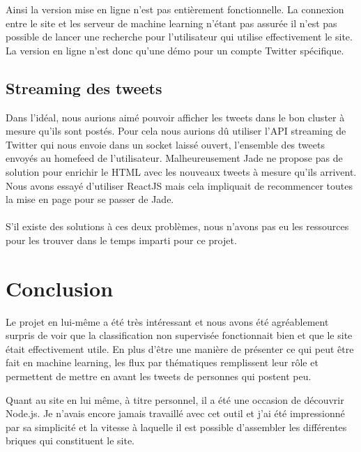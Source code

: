 \documentclass[a4paper]{article}
\begin{document}
Ainsi la version mise en ligne n'est pas entièrement fonctionnelle. La connexion entre le site et les serveur de machine learning n'étant pas assurée il n'est pas possible de lancer une recherche pour l'utilisateur qui utilise effectivement le site. La version en ligne n'est donc qu'une démo pour un compte Twitter spécifique.


\subsection{Streaming des tweets}
Dans l'idéal, nous aurions aimé pouvoir afficher les tweets dans le bon cluster à mesure qu'ils sont postés. Pour cela nous aurions dû utiliser l'API streaming de Twitter qui nous envoie dans un socket laissé ouvert, l'ensemble des tweets envoyés au homefeed de l'utilisateur. Malheureusement Jade ne propose pas de solution pour enrichir le HTML  avec les nouveaux tweets à mesure qu'ils arrivent. Nous avons essayé d'utiliser ReactJS mais cela impliquait de recommencer toutes la mise en page pour se passer de Jade.
\\ \\
S'il existe des solutions à ces deux problèmes, nous n'avons pas eu les ressources pour les trouver dans le temps imparti pour ce projet.


\section{Conclusion}
Le projet en lui-même a été très intéressant et nous avons été agréablement surpris de voir que la classification non supervisée fonctionnait bien et que le site était effectivement utile. En plus d'être une manière de présenter ce qui peut être fait en machine learning, les flux par thématiques remplissent leur rôle et permettent de mettre en avant les tweets de personnes qui postent peu.

Quant au site en lui même, à titre personnel, il a été une occasion de découvrir Node.js. Je n'avais encore jamais travaillé avec cet outil et j'ai été impressionné par sa simplicité et la vitesse à laquelle il est possible d'assembler les différentes briques qui constituent le site.
\end{document}
